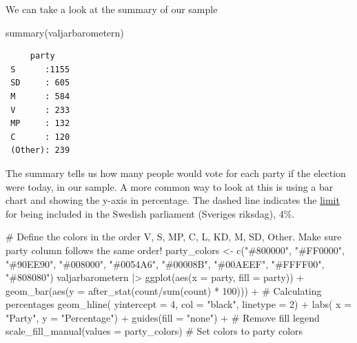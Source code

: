 \documentclass[
  letterpaper,
  DIV=11,
  numbers=noendperiod]{scrreprt}
\newenvironment{Shaded}{\begin{snugshade}}{\end{snugshade}}
\newcommand{\AttributeTok}[1]{\textcolor[rgb]{0.40,0.45,0.13}{#1}}
\newcommand{\CommentTok}[1]{\textcolor[rgb]{0.37,0.37,0.37}{#1}}
\newcommand{\DecValTok}[1]{\textcolor[rgb]{0.68,0.00,0.00}{#1}}
\newcommand{\FunctionTok}[1]{\textcolor[rgb]{0.28,0.35,0.67}{#1}}
\newcommand{\NormalTok}[1]{\textcolor[rgb]{0.00,0.23,0.31}{#1}}
\newcommand{\OtherTok}[1]{\textcolor[rgb]{0.00,0.23,0.31}{#1}}
\newcommand{\SpecialCharTok}[1]{\textcolor[rgb]{0.37,0.37,0.37}{#1}}
\newcommand{\StringTok}[1]{\textcolor[rgb]{0.13,0.47,0.30}{#1}}
\begin{document}
We can take a look at the summary of our sample

\begin{Shaded}
\begin{Highlighting}[]
\FunctionTok{summary}\NormalTok{(valjarbarometern)}
\end{Highlighting}
\end{Shaded}

\begin{verbatim}
     party     
 S      :1155  
 SD     : 605  
 M      : 584  
 V      : 233  
 MP     : 132  
 C      : 120  
 (Other): 239  
\end{verbatim}

The summary tells us how many people would vote for each party if the
election were today, in our sample. A more common way to look at this is
using a bar chart and showing the y-axis in percentage. The dashed line
indicates the
\href{https://www.informationsverige.se/en/om-sverige/att-paverka-i-sverige/det-svenska-valsystemet.html}{limit}
for being included in the Swedish parliament (Sveriges riksdag), 4\%.

\begin{Shaded}
\begin{Highlighting}[]
\CommentTok{\# Define the colors in the order V, S, MP, C, L, KD, M, SD, Other. Make sure party column follows the same order!}
\NormalTok{party\_colors }\OtherTok{\textless{}{-}} \FunctionTok{c}\NormalTok{(}\StringTok{"\#800000"}\NormalTok{, }\StringTok{"\#FF0000"}\NormalTok{, }\StringTok{"\#90EE90"}\NormalTok{, }\StringTok{"\#008000"}\NormalTok{, }\StringTok{"\#0054A6"}\NormalTok{, }\StringTok{"\#00008B"}\NormalTok{, }\StringTok{"\#00AEEF"}\NormalTok{, }\StringTok{"\#FFFF00"}\NormalTok{, }\StringTok{"\#808080"}\NormalTok{)}
\NormalTok{valjarbarometern }\SpecialCharTok{|\textgreater{}}
  \FunctionTok{ggplot}\NormalTok{(}\FunctionTok{aes}\NormalTok{(}\AttributeTok{x =}\NormalTok{ party, }\AttributeTok{fill =}\NormalTok{ party)) }\SpecialCharTok{+} 
  \FunctionTok{geom\_bar}\NormalTok{(}\FunctionTok{aes}\NormalTok{(}\AttributeTok{y =} \FunctionTok{after\_stat}\NormalTok{(count}\SpecialCharTok{/}\FunctionTok{sum}\NormalTok{(count) }\SpecialCharTok{*} \DecValTok{100}\NormalTok{))) }\SpecialCharTok{+} \CommentTok{\# Calculating percentages}
  \FunctionTok{geom\_hline}\NormalTok{(}
    \AttributeTok{yintercept =} \DecValTok{4}\NormalTok{,}
    \AttributeTok{col =} \StringTok{"black"}\NormalTok{,}
    \AttributeTok{linetype =} \DecValTok{2}\NormalTok{) }\SpecialCharTok{+}
  \FunctionTok{labs}\NormalTok{(}
    \AttributeTok{x =} \StringTok{"Party"}\NormalTok{,}
    \AttributeTok{y =} \StringTok{"Percentage"}\NormalTok{) }\SpecialCharTok{+}
  \FunctionTok{guides}\NormalTok{(}\AttributeTok{fill =} \StringTok{"none"}\NormalTok{) }\SpecialCharTok{+} \CommentTok{\# Remove fill legend}
  \FunctionTok{scale\_fill\_manual}\NormalTok{(}\AttributeTok{values =}\NormalTok{ party\_colors) }\CommentTok{\# Set colors to party colors}
\end{Highlighting}
\end{Shaded}
\end{document}
